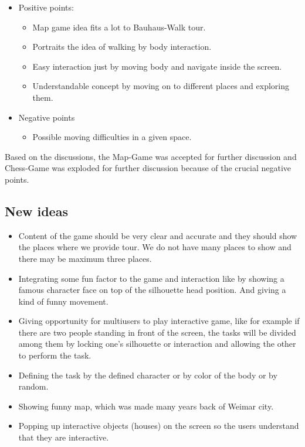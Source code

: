 \begin {enumerate}
\begin {itemize}
\item{Positive points:} 
\begin {itemize}

\item	Map game idea fits a lot to Bauhaus-Walk tour.
\item	Portraits the idea of walking by body interaction.
\item	Easy interaction just by moving body and navigate inside the screen.
\item	Understandable concept by moving on to different places and exploring them. 
\end {itemize}

\item{Negative points}
\begin {itemize}
\item	Possible moving difficulties in a given space.

\end {itemize}
\end {itemize}
\end {enumerate}

Based on the discussions, the Map-Game was accepted for further discussion and Chess-Game was exploded for further discussion because of the crucial negative points.


\subsection{New ideas}
\begin {itemize}

\item	Content of the game should be very clear and accurate and they should show the places where we provide tour. We do not have many places to show and there may be maximum three places.
\item	Integrating some fun factor to the game and interaction like by showing a famous character face on top of the silhouette head position. And giving a kind of funny movement. 
\item	Giving opportunity for multiusers to play interactive game, like for example if there are two people standing in front of the screen, the tasks will be divided among them by locking one's silhouette or interaction and allowing the other to perform the task.
\item	Defining the task by the defined character or by color of the body or by random. 
\item	Showing funny map, which was made many years back of Weimar city.
\item	Popping up interactive objects (houses) on the screen so the users understand that they are interactive. 

\end {itemize}


